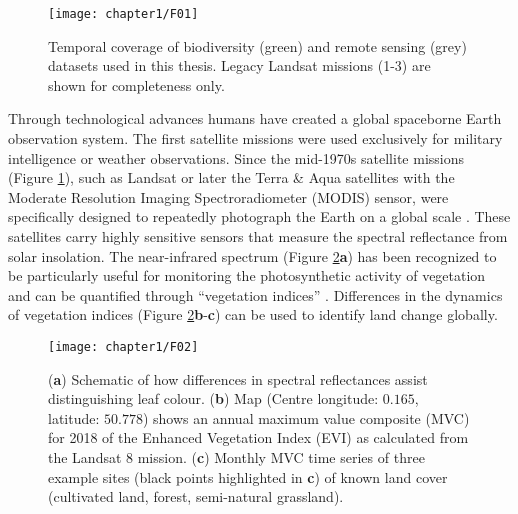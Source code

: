 \begin{figure}[htb]
\centering
\texttt{[image: chapter1/F01]}
\caption{ Temporal coverage of biodiversity (green) and remote sensing (grey) datasets used in this thesis. Legacy Landsat missions (1-3) are shown for completeness only. }
\label{F01_01}
\end{figure}

Through technological advances humans have created a global spaceborne Earth observation system. The first satellite missions were used exclusively for military intelligence or weather observations. Since the mid-1970s satellite missions (Figure \ref{F01_01}), such as Landsat or later the Terra \& Aqua satellites with the Moderate Resolution Imaging Spectroradiometer (MODIS) sensor, were specifically designed to repeatedly photograph the Earth on a global scale \citep{Schaaf2002,Zhang2006,Kennedy2014}. These satellites carry highly sensitive sensors that measure the spectral reflectance from solar insolation. The near-infrared spectrum (Figure \ref{F01_02}\textbf{a}) has been recognized to be particularly useful for monitoring the photosynthetic activity of vegetation and can be quantified through “vegetation indices” \citep{Tucker1979,Tucker1981,Pettorelli2005,Jiang2008}. Differences in the dynamics of vegetation indices (Figure \ref{F01_02}\textbf{b}-\textbf{c}) can be used to identify land change globally. 

\begin{figure}[htb]
\centering
\texttt{[image: chapter1/F02]}
\caption{ (\textbf{a}) Schematic of how differences in spectral reflectances assist distinguishing leaf colour. (\textbf{b}) Map (Centre longitude: $0.165$\textdegree, latitude: $50.778$\textdegree) shows an annual maximum value composite (MVC) for 2018 of the Enhanced Vegetation Index (EVI) as calculated from the Landsat 8 mission. (\textbf{c}) Monthly MVC time series of three example sites (black points highlighted in \textbf{c}) of known land cover (cultivated land, forest, semi-natural grassland). }
\label{F01_02}
\end{figure}

